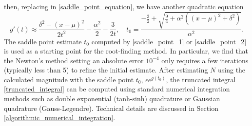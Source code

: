 \documentclass[10pt,a4paper,oneside]{article}
\numberwithin{equation}{section}
\begin{document}
then, replacing in \eqref{saddle_point_equation}, we have another quadratic equation
\begin{equation}\label{saddle_point_2}
g'(t) \approx \frac{\delta^2 + (x-\mu)^2}{2t^2} -\frac{\alpha^2}{2} -\frac{3}{2t}, \quad t_0 = \frac{-\frac{3}{2} + \sqrt{\frac{9}{4} + \alpha^2 \left((x-\mu)^2 + \delta^2\right)}}{\alpha^2}.
\end{equation}
The saddle point estimate $t_0$ computed by \eqref{saddle_point_1} or \eqref{saddle_point_2} is used as a starting point for the root-finding method. In particular, we find that the Newton's method setting an absolute error $10^{-4}$ only requires a few iterations (typically less than 5) to refine the initial estimate. After estimating $N$ using the calculated magnitude with the saddle point $t_0$, $\epsilon e^{g(t_0)}$, the truncated integral \eqref{truncated_integral} can be computed using standard numerical integration methods such as double exponential (tanh-sinh) quadrature or Gaussian quadrature (Gauss-Legendre). Technical details are discussed in Section \ref{algorithmic_numerical_integration}.
\end{document}
